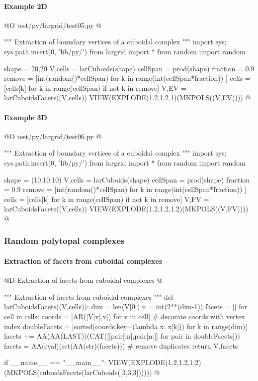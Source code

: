 \documentclass[11pt,oneside]{article}	%
\begin{document}
\paragraph{Example 2D}

@O test/py/largrid/test05.py
@{""" Extraction of boundary vertices of a cuboidal complex """
import sys; sys.path.insert(0, 'lib/py/')
from largrid import *
from random import random

shape = 20,20
V,cells = larCuboids(shape)
cellSpan = prod(shape)
fraction = 0.9
remove = [int(random()*cellSpan) for k in range(int(cellSpan*fraction)) ]
cells = [cells[k] for k in range(cellSpan) if not k in remove]
V,EV = larCuboidsFacets((V,cells))
VIEW(EXPLODE(1.2,1.2,1)(MKPOLS((V,EV))))
@}

\paragraph{Example 3D}

@O test/py/largrid/test06.py
@{""" Extraction of boundary vertices of a cuboidal complex """
import sys; sys.path.insert(0, 'lib/py/')
from largrid import *
from random import random

shape = (10,10,10)
V,cells = larCuboids(shape)
cellSpan = prod(shape)
fraction = 0.9
remove = [int(random()*cellSpan) for k in range(int(cellSpan*fraction)) ]
cells = [cells[k] for k in range(cellSpan) if not k in remove]
V,FV = larCuboidsFacets((V,cells))
VIEW(EXPLODE(1.2,1.2,1.2)(MKPOLS((V,FV))))
@}



\subsubsection{Random polytopal complexes}


\paragraph{Extraction of facets from cuboidal complexes}

@D Extraction of facets from cuboidal complexes
@{""" Extraction of facets from cuboidal complexes """
def larCuboidsFacets((V,cells)):
	dim = len(V[0])
	n = int(2**(dim-1))
	facets = []
	for cell in cells:
		coords = [AR([V[v],v]) for v in cell] # decorate coords with vertex index
		doubleFacets = [sorted(coords,key=(lambda x: x[k])) for k in range(dim)]
		facets += AA(AA(LAST))(CAT([[pair[:n],pair[n:]] for pair in doubleFacets]))
	facets = AA(eval)(set(AA(str)(facets))) # remove duplicates
	return V,facets

if __name__ == "__main__":
	VIEW(EXPLODE(1.2,1.2,1.2)(MKPOLS(cuboidsFacets(larCuboids([3,3,3])))))
@}
\end{document}
